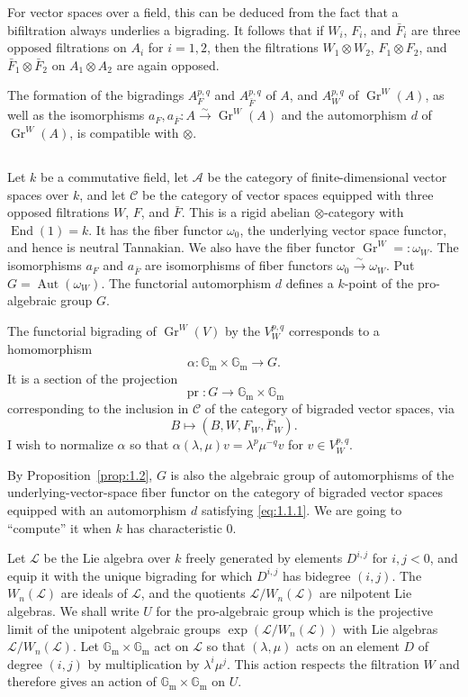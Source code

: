 \documentclass[12pt,a4paper]{article}
\theoremstyle{plain}
\theoremstyle{definition}
\DeclareMathOperator{\Gr}{Gr}
\DeclareMathOperator{\Aut}{Aut}
\DeclareMathOperator{\End}{End}
\DeclareMathOperator{\pr}{pr}
\newcommand{\A}{\mathcal{A}}
\newcommand{\Gm}{\mathbb{G}_\mathrm{m}}
\begin{document}
For vector spaces over a field, this can be deduced from the fact that a bifiltration always underlies a bigrading. It follows that if $W_i$, $F_i$, and $\bar F_i$ are three opposed filtrations on $A_i$ for $i=1,2$, then the filtrations $W_1\otimes W_2$, $F_1\otimes F_2$, and $\bar F_1\otimes\bar F_2$ on $A_1\otimes A_2$ are again opposed.

The formation of the bigradings $A_F^{p,q}$ and $A_{\bar F}^{p,q}$ of $A$, and $A_W^{p,q}$ of $\Gr^W(A)$, as well as the isomorphisms $a_F,a_{\bar F}:A\xrightarrow{\sim}\Gr^W(A)$ and the automorphism $d$ of $\Gr^W(A)$, is compatible with $\otimes$.

\subsection{}

Let $k$ be a commutative field, let $\A$ be the category of finite-dimensional vector spaces over $k$, and let $\mathscr C$ be the category of vector spaces equipped with three opposed filtrations $W$, $F$, and $\bar F$. This is a rigid abelian $\otimes$-category with $\End(1)=k$. It has the fiber functor $\omega_0$, the underlying vector space functor, and hence is neutral Tannakian. We also have the fiber functor $\Gr^W=:\omega_W$. The isomorphisms $a_F$ and $a_{\bar F}$ are isomorphisms of fiber functors $\omega_0\xrightarrow{\sim}\omega_W$. Put $G=\Aut(\omega_W)$. The functorial automorphism $d$ defines a $k$-point of the pro-algebraic group $G$.

The functorial bigrading of $\Gr^W(V)$ by the $V_W^{p,q}$ corresponds to a homomorphism
\[
\alpha:\Gm\times\Gm\longrightarrow G.
\]
It is a section of the projection
\[
\pr:G\to\Gm\times\Gm
\]
corresponding to the inclusion in $\mathscr C$ of the category of bigraded vector spaces, via
\[
B\longmapsto (B,W,F_W,\bar F_W).
\]
I wish to normalize $\alpha$ so that $\alpha(\lambda,\mu)v=\lambda^p\mu^{-q}v$ for $v\in V_W^{p,q}$.

By Proposition~\ref{prop:1.2}, $G$ is also the algebraic group of automorphisms of the underlying-vector-space fiber functor on the category of bigraded vector spaces equipped with an automorphism $d$ satisfying \eqref{eq:1.1.1}. We are going to ``compute'' it when $k$ has characteristic $0$.

Let $\mathcal L$ be the Lie algebra over $k$ freely generated by elements $D^{i,j}$ for $i,j<0$, and equip it with the unique bigrading for which $D^{i,j}$ has bidegree $(i,j)$. The $W_n(\mathcal L)$ are ideals of $\mathcal L$, and the quotients $\mathcal L/W_n(\mathcal L)$ are nilpotent Lie algebras. We shall write $U$ for the pro-algebraic group which is the projective limit of the unipotent algebraic groups $\exp(\mathcal L/W_n(\mathcal L))$ with Lie algebras $\mathcal L/W_n(\mathcal L)$. Let $\Gm\times\Gm$ act on $\mathcal L$ so that $(\lambda,\mu)$ acts on an element $D$ of degree $(i,j)$ by multiplication by $\lambda^i\mu^j$. This action respects the filtration $W$ and therefore gives an action of $\Gm\times\Gm$ on $U$.
\end{document}
